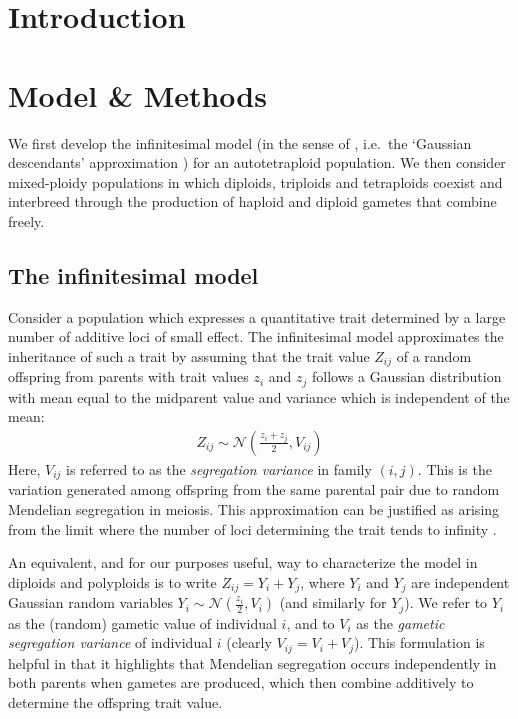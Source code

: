 \documentclass[unnumsec,webpdf,modern,large]{_oup-authoring-template}
\theoremstyle{thmstyleone}%
\theoremstyle{thmstyletwo}%
\theoremstyle{thmstylethree}%
\newcommand{\Normal}{\mathcal{N}}
\begin{document}
\section*{Introduction}

\section*{Model \& Methods}

We first develop the infinitesimal model (in the sense of \cite{barton2017},
i.e.~the `Gaussian descendants' approximation \citep{turelli2017}) for an
autotetraploid population. We then consider mixed-ploidy populations in which
diploids, triploids and tetraploids coexist and interbreed through the
production of haploid and diploid gametes that combine freely.

{\subsection{The infinitesimal model}\label{the-infinitesimal-model}}

Consider a population which expresses a quantitative trait determined by a
large number of additive loci of small effect.
The infinitesimal model approximates the inheritance of such a trait by
assuming that the trait value \(Z_{ij}\) of a random offspring from parents
with trait values \(z_i\) and \(z_j\) follows a Gaussian distribution with mean
equal to the midparent value and variance which is independent of the mean:
\begin{align}
  Z_{ij} \sim \Normal\left(\frac{z_i + z_j}{2}, V_{ij}\right) \label{eq:inf}
\end{align} 
Here, \(V_{ij}\) is referred to as the \emph{segregation variance} in family
\((i,j)\).
This is the variation generated among offspring from the same parental pair due
to random Mendelian segregation in meiosis.
This approximation can be justified as arising from the limit where the number
of loci determining the trait tends to infinity \citep{barton2017}.

An equivalent, and for our purposes useful, way to characterize the model in
diploids and polyploids is to write \(Z_{ij} = Y_i + Y_j\), where \(Y_i\) and
\(Y_j\) are independent Gaussian random variables \(Y_i \sim
\Normal\left(\frac{z_i}{2}, V_i\right)\) (and similarly for \(Y_j\)).
We refer to \(Y_i\) as the (random) gametic value of individual \(i\), and to
\(V_i\) as the \emph{gametic segregation variance} of individual \(i\)
(clearly $V_{ij} = V_i + V_j$).
This formulation is helpful in that it highlights that Mendelian segregation
occurs independently in both parents when gametes are produced, which then
combine additively to determine the offspring trait value.
\end{document}
